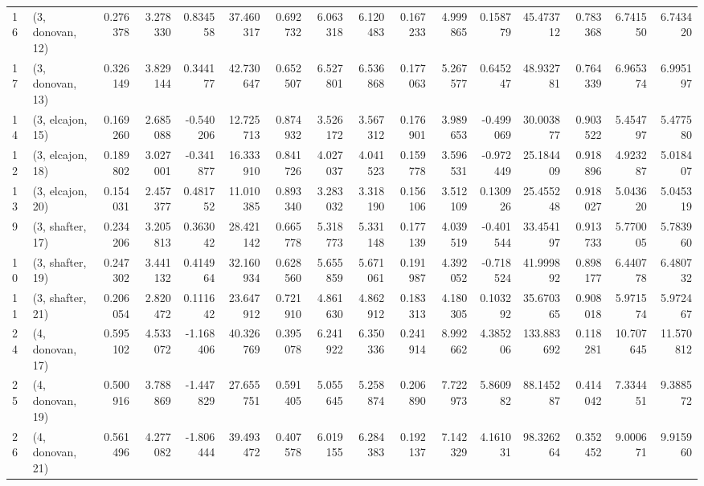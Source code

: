 \begin{tabular}{llrrrrrrrrrrrrrr}
16 &  (3, donovan, 12) &   0.276378 &  3.278330 &  0.834558 &  37.460317 &  0.692732 &   6.063318 &  6.120483 &  0.167233 &  4.999865 &  0.158779 &   45.473712 &  0.783368 &   6.741550 &   6.743420 \\
17 &  (3, donovan, 13) &   0.326149 &  3.829144 &  0.344177 &  42.730647 &  0.652507 &   6.527801 &  6.536868 &  0.177063 &  5.267577 &  0.645247 &   48.932781 &  0.764339 &   6.965374 &   6.995197 \\
14 &  (3, elcajon, 15) &   0.169260 &  2.685088 & -0.540206 &  12.725713 &  0.874932 &   3.526172 &  3.567312 &  0.176901 &  3.989653 & -0.499069 &   30.003877 &  0.903522 &   5.454797 &   5.477580 \\
12 &  (3, elcajon, 18) &   0.189802 &  3.027001 & -0.341877 &  16.333910 &  0.841726 &   4.027037 &  4.041523 &  0.159778 &  3.596531 & -0.972449 &   25.184409 &  0.918896 &   4.923287 &   5.018407 \\
13 &  (3, elcajon, 20) &   0.154031 &  2.457377 &  0.481752 &  11.010385 &  0.893340 &   3.283032 &  3.318190 &  0.156106 &  3.512109 &  0.130926 &   25.455248 &  0.918027 &   5.043620 &   5.045319 \\
9  &  (3, shafter, 17) &   0.234206 &  3.205813 &  0.363042 &  28.421142 &  0.665778 &   5.318773 &  5.331148 &  0.177139 &  4.039519 & -0.401544 &   33.454197 &  0.913733 &   5.770005 &   5.783960 \\
10 &  (3, shafter, 19) &   0.247302 &  3.441132 &  0.414964 &  32.160934 &  0.628560 &   5.655859 &  5.671061 &  0.191987 &  4.392052 & -0.718524 &   41.999892 &  0.898177 &   6.440778 &   6.480732 \\
11 &  (3, shafter, 21) &   0.206054 &  2.820472 &  0.111642 &  23.647912 &  0.721910 &   4.861630 &  4.862912 &  0.183313 &  4.180305 &  0.103292 &   35.670365 &  0.908018 &   5.971574 &   5.972467 \\
24 &  (4, donovan, 17) &   0.595102 &  4.533072 & -1.168406 &  40.326769 &  0.395078 &   6.241922 &  6.350336 &  0.241914 &  8.992662 &  4.385206 &  133.883692 &  0.118281 &  10.707645 &  11.570812 \\
25 &  (4, donovan, 19) &   0.500916 &  3.788869 & -1.447829 &  27.655751 &  0.591405 &   5.055645 &  5.258874 &  0.206890 &  7.722973 &  5.860982 &   88.145287 &  0.414042 &   7.334451 &   9.388572 \\
26 &  (4, donovan, 21) &   0.561496 &  4.277082 & -1.806444 &  39.493472 &  0.407578 &   6.019155 &  6.284383 &  0.192137 &  7.142329 &  4.161031 &   98.326264 &  0.352452 &   9.000671 &   9.915960 \\

\end{tabular}
